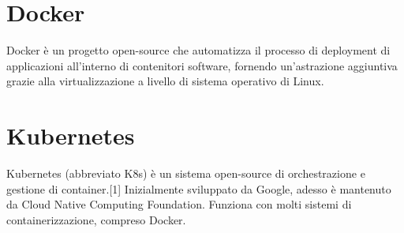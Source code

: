 \documentclass[12pt,a4paper]{report}
\begin{document}
\section*{Docker}
Docker è un progetto open-source che automatizza il processo di deployment di applicazioni all'interno di contenitori software, fornendo un'astrazione aggiuntiva grazie alla virtualizzazione a livello di sistema operativo di Linux.\cite{itwiki:123095653}

\section*{Kubernetes}
Kubernetes (abbreviato K8s) è un sistema open-source di orchestrazione e gestione di container.[1] Inizialmente sviluppato da Google, adesso è mantenuto da Cloud Native Computing Foundation. Funziona con molti sistemi di containerizzazione, compreso Docker.\cite{itwiki:119581182}

\clearpage



\end{document}
